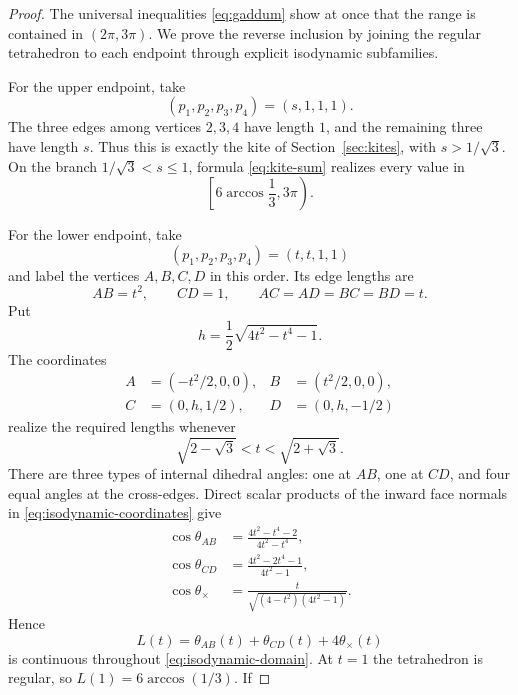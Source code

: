 \documentclass[11pt,a4paper]{article}
\theoremstyle{definition}
\theoremstyle{remark}
\begin{document}
\begin{proof}
The universal inequalities \eqref{eq:gaddum} show at once that the range is
contained in $(2\pi,3\pi)$.  We prove the reverse inclusion by joining the
regular tetrahedron to each endpoint through explicit isodynamic
subfamilies.

For the upper endpoint, take
\[
 (p_1,p_2,p_3,p_4)=(s,1,1,1).
\]
The three edges among vertices $2,3,4$ have length $1$, and the remaining
three have length $s$.  Thus this is exactly the kite of
Section~\ref{sec:kites}, with $s>1/\sqrt3$.  On the branch
$1/\sqrt3<s\leq1$, formula \eqref{eq:kite-sum} realizes every value in
\[
 \left[6\arccos\frac13,3\pi\right).
\]

For the lower endpoint, take
\begin{equation}\label{eq:isodynamic-lower-path}
 (p_1,p_2,p_3,p_4)=(t,t,1,1)
\end{equation}
and label the vertices $A,B,C,D$ in this order.  Its edge lengths are
\[
 AB=t^2,\qquad CD=1,\qquad
 AC=AD=BC=BD=t.
\]
Put
\[
 h=\frac12\sqrt{4t^2-t^4-1}.
\]
The coordinates
\begin{equation}\label{eq:isodynamic-coordinates}
 \begin{aligned}
 A&=(-t^2/2,0,0),& B&=(t^2/2,0,0),\\
 C&=(0,h,1/2),& D&=(0,h,-1/2)
 \end{aligned}
\end{equation}
realize the required lengths whenever
\begin{equation}\label{eq:isodynamic-domain}
 \sqrt{2-\sqrt3}<t<\sqrt{2+\sqrt3}.
\end{equation}
There are three types of internal dihedral angles: one at $AB$, one at
$CD$, and four equal angles at the cross-edges.  Direct scalar products of
the inward face normals in \eqref{eq:isodynamic-coordinates} give
\begin{align}
 \cos\theta_{AB}
 &=\frac{4t^2-t^4-2}{4t^2-t^4},\label{eq:iso-cos-ab}\\
 \cos\theta_{CD}
 &=\frac{4t^2-2t^4-1}{4t^2-1},\label{eq:iso-cos-cd}\\
 \cos\theta_{\times}
 &=\frac{t}{\sqrt{(4-t^2)(4t^2-1)}}.\label{eq:iso-cos-cross}
\end{align}
Hence
\begin{equation}\label{eq:isodynamic-path-sum}
 L(t)=\theta_{AB}(t)+\theta_{CD}(t)+4\theta_{\times}(t)
\end{equation}
is continuous throughout \eqref{eq:isodynamic-domain}.  At $t=1$ the
tetrahedron is regular, so $L(1)=6\arccos(1/3)$.  If

\end{proof}
\end{document}
